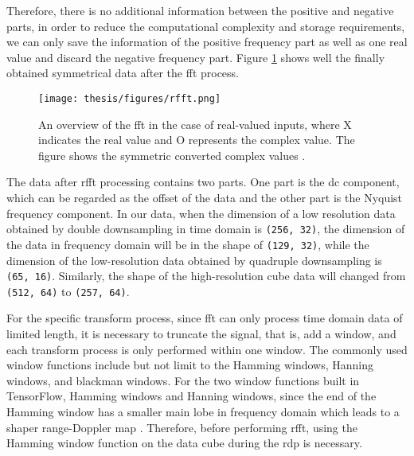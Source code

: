 Therefore, there is no additional information between the positive and negative parts, in order to reduce the computational complexity and storage requirements, we can only save the information of the positive frequency part as well as one real value and discard the negative frequency part. Figure \ref{an overview of the rfft} shows well the finally obtained symmetrical data after the \gls{fft} process.

\begin{figure}
	\centering
	\texttt{[image: thesis/figures/rfft.png]}
	\caption{An overview of the \gls{fft} in the case of real-valued inputs, where X indicates the real value and O represents the complex value. The figure shows the symmetric converted complex values \cite{sorensen_real-valued_1987}.}
	\label{an overview of the rfft}
\end{figure}

The data after \gls{rfft} processing contains two parts. One part is the \gls{dc} component, which can be regarded as the offset of the data and the other part is the Nyquist frequency component. In our data, when the dimension of a low resolution data obtained by double downsampling in time domain is \texttt{(256, 32)}, the dimension of the data in frequency domain will be in the shape of  \texttt{(129, 32)}, while the dimension of the low-resolution data obtained by quadruple downsampling is \texttt{(65, 16)}. Similarly, the shape of the high-resolution cube data will changed from \texttt{(512, 64)} to \texttt{(257, 64)}.

For the specific transform process, since \gls{fft} can only process time domain data of limited length, it is necessary to truncate the signal, that is, add a window, and each transform process is only performed within one window. The commonly used window functions include but not limit to the Hamming windows, Hanning windows, and blackman windows. For the two window functions built in TensorFlow, Hamming windows and Hanning windows, since the end of the Hamming window has a smaller main lobe in frequency domain which leads to a shaper range-Doppler map \cite{podder2014comparative}. Therefore, before performing \gls{rfft}, using the Hamming window function on the data cube during the \gls{rdp} is necessary.

